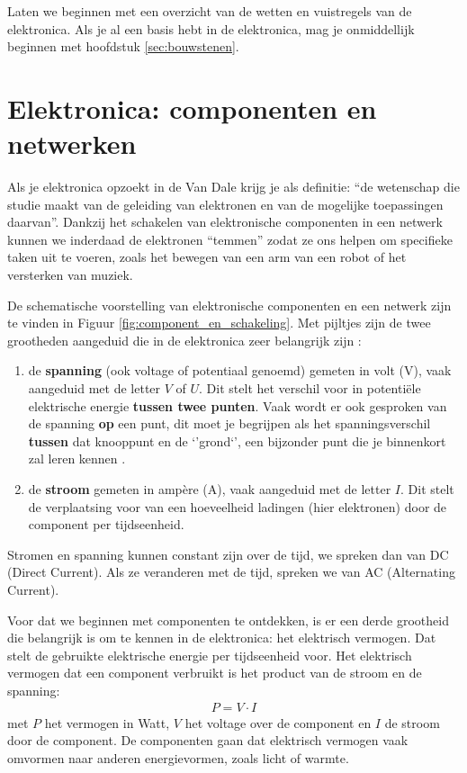 \documentclass{article}
\begin{document}
		Laten we beginnen met een overzicht van de wetten en vuistregels van de elektronica. Als je al een basis hebt in de elektronica, mag je onmiddellijk beginnen met hoofdstuk \ref{sec:bouwstenen}.

	\section{Elektronica: componenten en netwerken}

		Als je elektronica opzoekt in de  Van Dale krijg je als definitie: ``de wetenschap die studie maakt van de geleiding van elektronen en van de mogelijke toepassingen daarvan''.
		Dankzij het schakelen van elektronische componenten in een netwerk kunnen we inderdaad de elektronen ``temmen'' zodat ze ons helpen om specifieke taken uit te voeren, zoals het bewegen van een arm van een robot of het versterken van muziek.

		De schematische voorstelling van elektronische componenten en een netwerk zijn te vinden in Figuur \ref{fig:component_en_schakeling}. Met pijltjes zijn de twee grootheden aangeduid die in de elektronica zeer belangrijk zijn :

		\begin{enumerate}
			\item de \textbf{spanning} (ook voltage of potentiaal genoemd) gemeten in volt (V), vaak aangeduid met de letter $V$ of $U$. Dit stelt het verschil voor in potenti\"ele elektrische energie \textbf{tussen twee punten}. Vaak wordt er ook gesproken van de spanning \textbf{op} een punt, dit moet je begrijpen als het spanningsverschil \textbf{tussen} dat knooppunt en de `'grond`', een bijzonder punt die je binnenkort  zal leren kennen .

			\item de \textbf{stroom} gemeten in amp\`ere (A), vaak aangeduid met de letter $I$. Dit stelt de verplaatsing voor van een hoeveelheid ladingen (hier elektronen) door de component per tijdseenheid.
		\end{enumerate}

		Stromen en spanning kunnen constant zijn over de tijd, we spreken dan van DC (Direct Current). Als ze veranderen met de tijd, spreken we van AC (Alternating Current).

		Voor dat we beginnen met componenten te ontdekken, is er een derde grootheid die belangrijk is om te kennen in de elektronica: het elektrisch vermogen. Dat stelt de gebruikte elektrische energie per tijdseenheid voor. Het elektrisch vermogen dat een component verbruikt is het product van de stroom en de spanning:
		\begin{align}
		     P = V \cdot I
		     \label{eq:vermogen}
		 \end{align} 
		met $P$ het vermogen in Watt, $V$ het voltage over de component en $I$ de stroom door de component. De componenten gaan dat elektrisch vermogen vaak omvormen naar anderen energievormen, zoals licht of warmte.
\end{document}
